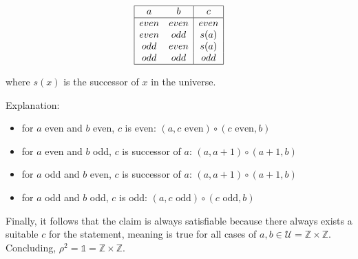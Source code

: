 \documentclass[unicode,11pt,a4paper,oneside,numbers=endperiod,openany]{scrartcl}
\begin{document}
\[
    \begin{array}{|cc|c|}
        \hline
        a & b & c \\
        \hline
        even & even & even    \\
        even & odd & s(a) \\
        odd & even & s(a) \\
        odd & odd & odd    \\
        \hline
    \end{array}
\]

where \( s(x) \) is the successor of \( x \) in the universe.

\noindent Explanation:
\begin{itemize}
\item for \( a \) even and \( b \) even, \( c \) is even: 
    \( (a, c \text{ even}) \circ (c \text{ even}, b) \)   

\item for \( a \) even and \( b \) odd, \( c \) is successor of \( a \): 
    \( (a, a + 1) \circ (a + 1, b) \)   

\item for \( a \) odd and \( b \) even, \( c \) is successor of \( a \):
    \( (a, a + 1) \circ (a + 1, b) \)   

\item for \( a \) odd and \( b \) odd, \( c \) is odd:  
    \( (a, c \text{ odd}) \circ (c \text{ odd}, b) \)   

\end{itemize}

Finally, it follows that the claim is always satisfiable because there always exists a suitable \( c \) 
for the statement, 
meaning is true for all cases of \( a, b \in \mathcal{U} = \mathbb{Z} \times \mathbb{Z} \).
Concluding, \( \rho^2 = \mathds{1} = \mathbb{Z} \times \mathbb{Z} \).
\end{document}
